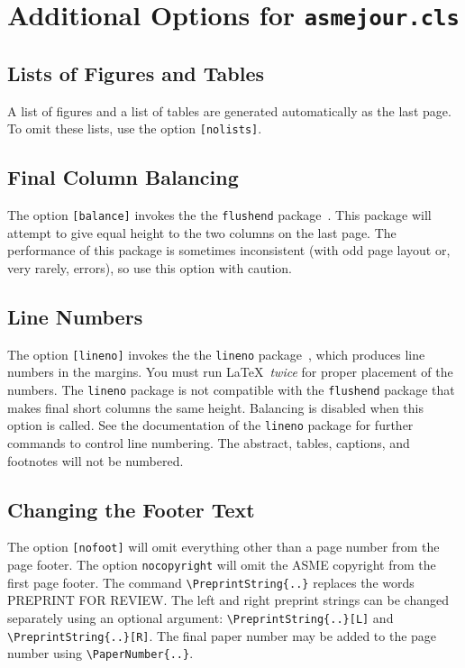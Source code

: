 \documentclass[balance,nocopyright,upint,varvw,hyphenate,barcolor=Goldenrod3,german]{asmejour}%
\begin{document}


\section{Additional Options for \texttt{asmejour.cls}}

\subsection{Lists of Figures and Tables} A list of figures and a list of tables are generated automatically as the last page.  To omit these lists, use the option \texttt{[nolists]}.

\subsection{Final Column Balancing} The option \texttt{[balance]} invokes the the \texttt{flushend} package~\cite{tolusis}.
This package will attempt to give equal height to the two columns on the last page. The performance of this package is sometimes inconsistent (with odd page layout or, very rarely, errors), so use this option with caution.

\subsection{Line Numbers} The option \texttt{[lineno]} invokes the the \texttt{lineno} package~\cite{bottcher}, which produces line numbers in the margins. You must run \LaTeX\ \emph{twice} for proper placement of the numbers. The \texttt{lineno} package is not compatible with the \texttt{flushend} package that makes final short columns the same height. Balancing is disabled when this option is called. See the documentation of the \texttt{lineno} package for further commands to control line numbering. The abstract, tables, captions, and footnotes will not be numbered.

\subsection{Changing the Footer Text}\label{sec:footer} The option \texttt{[nofoot]} will omit everything other than a page number from the page footer.  The option \texttt{nocopyright} will omit the ASME copyright from the first page footer. The command \verb|\PreprintString{..}| replaces the words \textsf{PREPRINT FOR REVIEW}. The left and right preprint strings can be changed separately using an optional argument: \verb|\PreprintString{..}[L]| and \verb|\PreprintString{..}[R]|.
The final paper number may be added to the page number using \verb|\PaperNumber{..}|.
\end{document}
